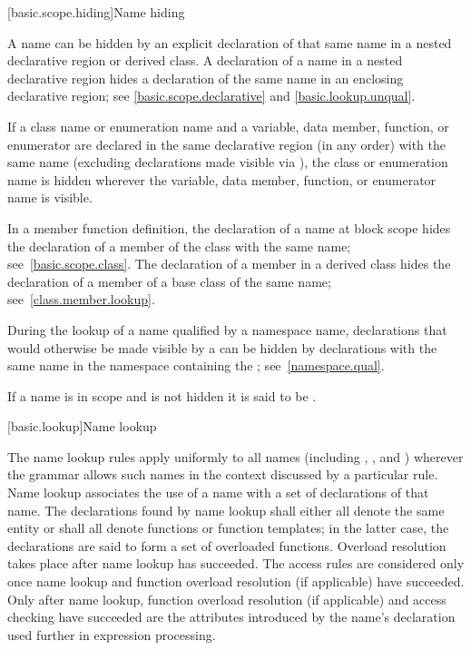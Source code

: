 [basic.scope.hiding]{Name hiding}

\pnum
{}%
%
%
A name can be hidden by an explicit declaration of that same name in a
nested declarative region or derived class.
A declaration of a name in a nested declarative region
hides a declaration of the same name in an enclosing declarative region;
see \ref{basic.scope.declarative} and \ref{basic.lookup.unqual}.

\pnum
{}%
If a class name or enumeration name and
a variable, data member, function, or enumerator
are declared in the same declarative region (in any order) with the
same name (excluding declarations made visible
via ),
the class or enumeration name is hidden wherever the variable, data member,
function, or enumerator name is visible.

\pnum
In a member function definition, the declaration of a name
at block scope
hides
the declaration of a member of the class with the same name;
see~\ref{basic.scope.class}. The declaration of a member in a derived
class hides the declaration of a member of
a base class of the same name; see~\ref{class.member.lookup}.

\pnum
During the lookup of a name qualified by a namespace name, declarations
that would otherwise be made visible by a  can
be hidden by declarations with the same name in the namespace containing
the ; see~\ref{namespace.qual}.

\pnum
{}%
If a name is in scope and is not hidden it is said to be .%

[basic.lookup]{Name lookup}%
%
%

\pnum
The name lookup rules apply uniformly to all names (including
,
, and
) wherever the grammar allows
such names in the context discussed by a particular rule. Name lookup
associates the use of a name with a set of declarations of
that name.
The declarations found by name lookup shall either all denote the same entity or
shall all denote functions or function templates;
in the latter case,
the declarations are said to form a set of overloaded
functions. Overload resolution
takes place after name lookup has succeeded. The access rules
are considered only once name lookup and
function overload resolution (if applicable) have succeeded. Only after
name lookup, function overload resolution (if applicable) and access
checking have succeeded are the attributes introduced by the name's
declaration used further in expression processing.

